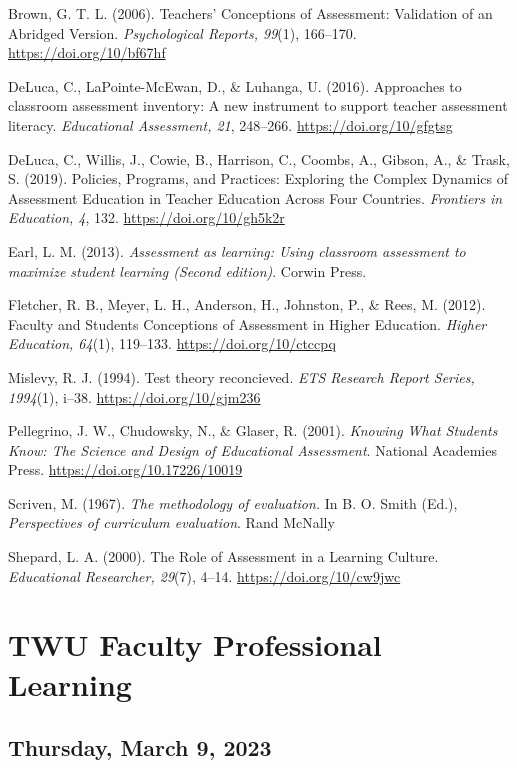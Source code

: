 \documentclass[
]{book}
\begin{document}
Brown, G. T. L. (2006). Teachers' Conceptions of Assessment: Validation of an Abridged Version. \emph{Psychological Reports, 99}(1), 166--170. \url{https://doi.org/10/bf67hf}

DeLuca, C., LaPointe-McEwan, D., \& Luhanga, U. (2016). Approaches to classroom assessment inventory: A new instrument to support teacher assessment literacy. \emph{Educational Assessment, 21}, 248--266. \url{https://doi.org/10/gfgtsg}

DeLuca, C., Willis, J., Cowie, B., Harrison, C., Coombs, A., Gibson, A., \& Trask, S. (2019). Policies, Programs, and Practices: Exploring the Complex Dynamics of Assessment Education in Teacher Education Across Four Countries. \emph{Frontiers in Education, 4}, 132. \url{https://doi.org/10/gh5k2r}

Earl, L. M. (2013). \emph{Assessment as learning: Using classroom assessment to maximize student learning (Second edition)}. Corwin Press.

Fletcher, R. B., Meyer, L. H., Anderson, H., Johnston, P., \& Rees, M. (2012). Faculty and Students Conceptions of Assessment in Higher Education. \emph{Higher Education, 64}(1), 119--133. \url{https://doi.org/10/ctccpq}

Mislevy, R. J. (1994). Test theory reconcieved. \emph{ETS Research Report Series, 1994}(1), i--38. \url{https://doi.org/10/gjm236}

Pellegrino, J. W., Chudowsky, N., \& Glaser, R. (2001). \emph{Knowing What Students Know: The Science and Design of Educational Assessment}. National Academies Press. \url{https://doi.org/10.17226/10019}

Scriven, M. (1967). \emph{The methodology of evaluation.} In B. O. Smith (Ed.), \emph{Perspectives of curriculum evaluation}. Rand McNally

Shepard, L. A. (2000). The Role of Assessment in a Learning Culture. \emph{Educational Researcher, 29}(7), 4--14. \url{https://doi.org/10/cw9jwc}

\hypertarget{twu-faculty-professional-learning}{%
\chapter{TWU Faculty Professional Learning}\label{twu-faculty-professional-learning}}

\hypertarget{thursday-march-9-2023}{%
\section*{Thursday, March 9, 2023}\label{thursday-march-9-2023}}
\end{document}
